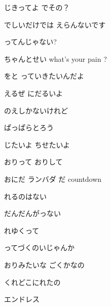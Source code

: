 \documentclass[a4paper,tate,twocolumn,12pt]{ltjtarticle}
\begin{document}
\begin{flushleft}
\vspace{2em}

\noindent\begin{minipage}{\linewidth}
じきってよ でその？

でしいだけでは えらんないです

ってんじゃない?

ちゃんとせい what's your pain ?

をと っていきたいんだよ
\end{minipage}

\vspace{2em}

\noindent\begin{minipage}{\linewidth}
えるぜ にだるいよ

のえしかないけれど

ぱっぱらとろう

じたいよ ちせたいよ

おりって おりして

おにだ ランバダ だ countdown
\end{minipage}

\vspace{2em}

\noindent\begin{minipage}{\linewidth}
れるのはない

だんだんがっない

れゆくって

ってづくのいじゃんか

おりみたいな ごくかなの

くれどこにれたの
\end{minipage}

\vspace{2em}

\noindent\begin{minipage}{\linewidth}
エンドレス


\end{minipage}
\end{flushleft}
\end{document}
